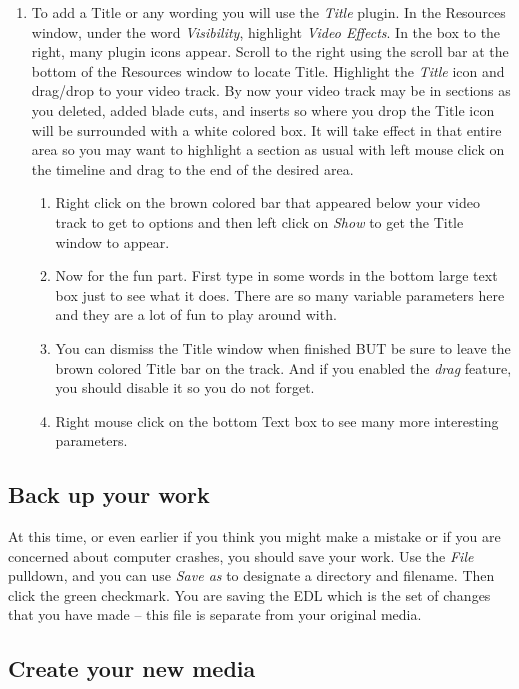 \begin{enumerate}[resume]
	\item To add a Title or any wording you will use the \textit{Title} plugin.  In the Resources window, under the
	word \textit{Visibility}, highlight \textit{Video Effects}.  In the box to the right, many plugin icons appear.   Scroll
	to the right using the scroll bar at the bottom of the Resources window to locate Title.  Highlight the
	\textit{Title} icon and drag/drop to your video track.  By now your video track may be in sections as you
	deleted, added blade cuts, and inserts so where you drop the Title icon will be surrounded with a
	white colored box.  It will take effect in that entire area so you may want to highlight a section as
	usual with left mouse click on the timeline and drag to the end of the desired area.
	\begin{enumerate}
		\item Right click on the brown colored bar that appeared below your video track to get to options and
		then left click on \textit{Show} to get the Title window to appear.
		\item Now for the fun part.  First type in some words in the bottom large text box just to see what it
		does.  There are so many variable parameters here and they are a lot of fun to play around with.
		\item You can dismiss the Title window when finished BUT be sure to leave the brown colored Title bar
		on the track.  And if you enabled the \textit{drag} feature, you should disable it so you do not forget.
		\item Right mouse click on the bottom Text box to see many more interesting parameters.
	\end{enumerate}
\end{enumerate}

\subsection{Back up your work}%
\label{sub:backup_your_work}

At this time, or even earlier if you think you might make a mistake or if you are concerned about computer crashes, you should save your work.  Use the \textit{File} pulldown, and you can use \textit{Save as} to designate a directory and filename.  Then click the green checkmark.  You are saving the EDL which is the set of changes that you have made -- this file is separate from your original media.

\subsection{Create your new media}%
\label{sub:create_new_media}

